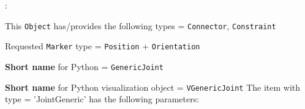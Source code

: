 \noindent {}:
\bi
  \item This \texttt{Object} has/provides the following types = \texttt{Connector}, \texttt{Constraint}
  \item Requested \texttt{Marker} type = \texttt{Position} + \texttt{Orientation}
  \item {\bf Short name} for Python = \texttt{GenericJoint}
  \item {\bf Short name} for Python visualization object = \texttt{VGenericJoint}
\ei\vspace{12pt} \noindent 
The item  with type = 'JointGeneric' has the following parameters:
\vspace{-0.5cm}\\
\vspace{-0.5cm}\\
